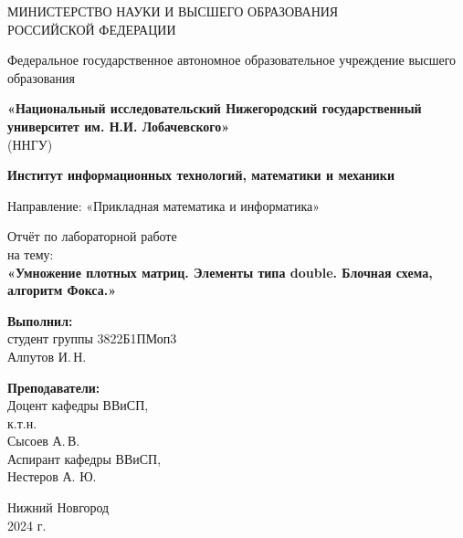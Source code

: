 \documentclass{report}
\begin{document}
\begin{titlepage}
    \begin{center}
        \large
        МИНИСТЕРСТВО НАУКИ И ВЫСШЕГО ОБРАЗОВАНИЯ\\ 
        РОССИЙСКОЙ ФЕДЕРАЦИИ

        Федеральное государственное автономное образовательное учреждение высшего образования
        \vspace{0.5cm}

        \textbf{«Национальный исследовательский Нижегородский государственный университет им. Н.И. Лобачевского»}\\
        (ННГУ)\\
        \vspace{1cm}
        
        \textbf{Институт информационных технологий, математики и механики}\\
        \vspace{1cm}

        Направление: «Прикладная математика и информатика»\\
        \vfill

        \Large
        Отчёт по лабораторной работе \\
        на тему:\\
        \textbf{«Умножение плотных матриц. Элементы типа double. Блочная схема, алгоритм Фокса.»}
        \bigskip

    \end{center}
    \vfill

    \hfill
    \begin{minipage}{0.45\textwidth}
        \textbf{Выполнил:}\\
        студент группы 3822Б1ПМоп3 \\
        \underline{\hspace{3cm}} Алпутов И.\,Н.
    \end{minipage}%
    \hfill
    \begin{minipage}{0.45\textwidth}
        \textbf{Преподаватели:}\\
        Доцент кафедры ВВиСП,\\
        к.т.н.\\
        \underline{\hspace{3cm}} Сысоев А.\,В.\\[1cm]
        Аспирант кафедры ВВиСП,\\
        \underline{\hspace{3cm}} Нестеров А. Ю.
    \end{minipage}%
    \vfill

    \begin{center}
        Нижний Новгород\\
        2024 г.
    \end{center}
\end{titlepage}
\end{document}
